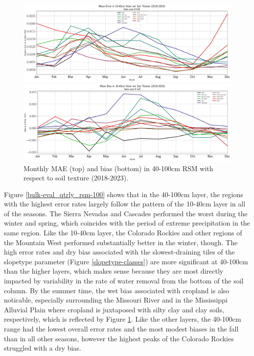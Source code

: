 \begin{figure}[h!]
    \centering

    \includegraphics[width=.99\linewidth,draft=false]{figures/grid-eval_qtrly/eval-grid_full_lstm-rsm-9_pixelwise-time-stats_monthly-txtr-abs-err-state-rsm-40.png}

    \includegraphics[width=.99\linewidth,draft=false]{figures/grid-eval_qtrly/eval-grid_full_lstm-rsm-9_pixelwise-time-stats_monthly-txtr-bias-state-rsm-40.png}

    \caption{Monthly MAE (top) and bias (bottom) in 40-100cm RSM with respect to soil texture (2018-2023).}
    \label{bulk-eval_monthly_txtr-bias_rsm-100}
\end{figure}


Figure \ref{bulk-eval_qtrly_rsm-100} shows that in the 40-100cm layer, the regions with the highest error rates largely follow the pattern of the 10-40cm layer in all of the seasons. The Sierra Nevadas and Cascades performed the worst during the winter and spring, which coincides with the period of extreme precipitation in the same region. Like the 10-40cm layer, the Colorado Rockies and other regions of the Mountain West performed substantially better in the winter, though. The high error rates and dry bias associated with the slowest-draining tiles of the slopetype parameter (Figure \ref{slopetype-classes}) are more significant at 40-100cm than the higher layers, which makes sense because they are most directly impacted by variability in the rate of water removal from the bottom of the soil column. By the summer time, the wet bias associated with cropland is also noticable, especially surrounding the Missouri River and in the Mississippi Alluvial Plain where cropland is juxtaposed with silty clay and clay soils, respectively, which is reflected by Figure \ref{bulk-eval_monthly_txtr-bias_rsm-100}. Like the other layers, the 40-100cm range had the lowest overall error rates and the most modest biases in the fall than in all other seasons, however the highest peaks of the Colorado Rockies struggled with a dry bias.

